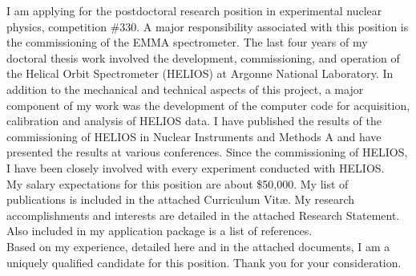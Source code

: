 I am applying for the postdoctoral research position in experimental nuclear physics, competition \#330.  
A major responsibility associated with this position is the commissioning of the EMMA spectrometer.
The last four years of my doctoral thesis work involved the development, commissioning, and operation of the Helical Orbit Spectrometer (HELIOS) at Argonne National Laboratory.  In addition to the mechanical and technical aspects of this project, a major component of my work was the development of the computer code for acquisition, calibration and analysis of HELIOS data.  I have published the results of the commissioning of HELIOS in %
Nuclear Instruments and Methods A
and have presented the results at various conferences.  Since the commissioning of HELIOS, I have been closely involved with every experiment conducted with HELIOS.\\ 

My salary expectations for this position are about \$50,000.  My list of publications is included in the attached Curriculum Vit\ae.  My research accomplishments and interests are detailed in the attached Research Statement.  Also included in my application package is a list of references.\\

Based on my experience, detailed here and in the attached documents, I am a uniquely qualified candidate for this position.  Thank you for your consideration.